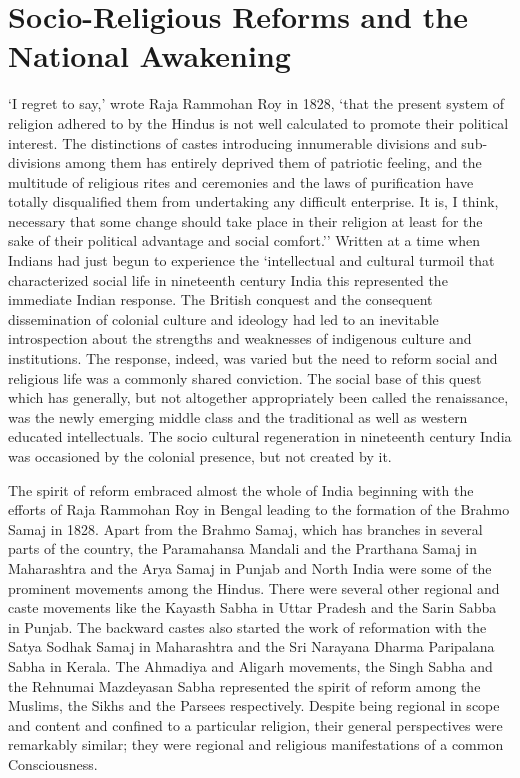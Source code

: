 \cleardoublepage
\chapter{Socio-Religious Reforms and the National Awakening}

`I regret to say,' wrote Raja Rammohan Roy in 1828, `that the present system of religion adhered to by the Hindus is not well calculated to promote their political interest. The distinctions of castes introducing innumerable divisions and sub-divisions among them has entirely deprived them of patriotic feeling, and the multitude of religious rites and ceremonies and the laws of purification have totally disqualified them from undertaking any difficult enterprise. It is, I think, necessary that some change should take place in their religion at least for the sake of their political advantage and social comfort.'' Written at a time when Indians had just begun to experience the `intellectual and cultural turmoil that characterized social life in nineteenth century India this represented the immediate Indian response. The British conquest and the consequent dissemination of colonial culture and ideology had led to an inevitable introspection about the strengths and weaknesses of indigenous culture and institutions. The response, indeed, was varied but the need to reform social and religious life was a commonly shared conviction. The social base of this quest which has generally, but not altogether appropriately been called the renaissance, was the newly emerging middle class and the traditional as well as western educated intellectuals. The socio­ cultural regeneration in nineteenth century India was occasioned by the colonial presence, but not created by it.

The spirit of reform embraced almost the whole of India beginning with the efforts of Raja Rammohan Roy in Bengal leading to the formation of the Brahmo Samaj in 1828. Apart from the Brahmo Samaj, which has branches in several parts of the country, the Paramahansa Mandali and the Prarthana Samaj in Maharashtra and the Arya Samaj in Punjab and North India were some of the prominent movements among the Hindus. There were several other regional and caste movements like the Kayasth Sabha in Uttar Pradesh and the Sarin Sabba in Punjab. The backward castes also started the work of reformation with the Satya Sodhak Samaj in Maharashtra and the Sri Narayana Dharma Paripalana Sabha in Kerala. The Ahmadiya and Aligarh movements, the Singh Sabha and the Rehnumai Mazdeyasan Sabha represented the spirit of reform among the Muslims, the Sikhs and the Parsees respectively. Despite being regional in scope and content and confined to a particular religion, their general perspectives were remarkably similar; they were regional and religious manifestations of a common Consciousness.

